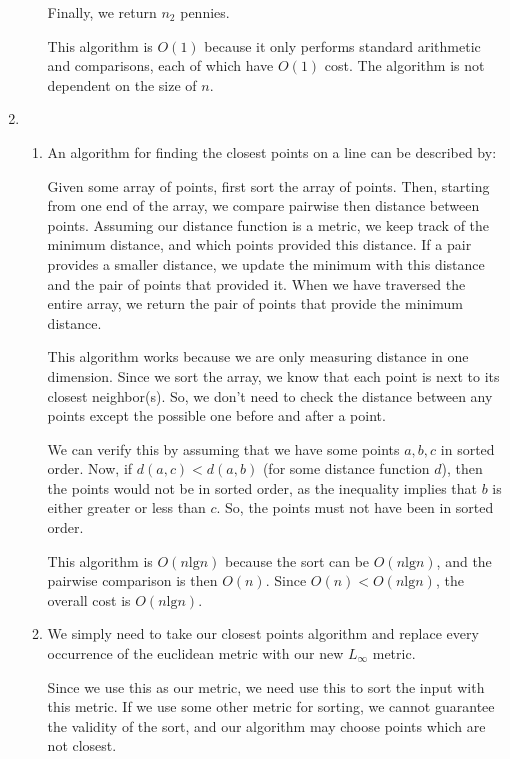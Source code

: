 \documentclass[12pt,letterpaper]{article}
\newcommand{\lb}[0]{\text{lg}}
\begin{document}
\begin{enumerate}
\begin{enumerate}
          Finally, we return $n_2$ pennies.

          This algorithm is $O(1)$ because it only performs standard arithmetic and comparisons, each of which have $O(1)$ cost.
          The algorithm is not dependent on the size of $n$.
      \end{enumerate}

    \item
      \begin{enumerate}
        \item An algorithm for finding the closest points on a line can be described by:

          Given some array of points, first sort the array of points.
          Then, starting from one end of the array, we compare pairwise then distance between points.
          Assuming our distance function is a metric, we keep track of the minimum distance, and which points provided this distance.
          If a pair provides a smaller distance, we update the minimum with this distance and the pair of points that provided it.
          When we have traversed the entire array, we return the pair of points that provide the minimum distance.

          This algorithm works because we are only measuring distance in one dimension.
          Since we sort the array, we know that each point is next to its closest neighbor(s).
          So, we don't need to check the distance between any points except the possible one before and after a point.

          We can verify this by assuming that we have some points $a, b, c$ in sorted order.
          Now, if $d(a, c) < d(a, b)$ (for some distance function $d$), then the points would not be in sorted order, as the inequality implies that $b$ is either greater or less than $c$. So, the points must not have been in sorted order.

          This algorithm is $O(n\lb{n})$ because the sort can be $O(n\lb{n})$, and the pairwise comparison is then $O(n)$.
          Since $O(n) < O(n\lb{n})$, the overall cost is $O(n\lb{n})$.

        \item
          We simply need to take our closest points algorithm and replace every occurrence of the euclidean metric with our new $L_{\infty}$ metric.

          Since we use this as our metric, we need use this to sort the input with this metric.
          If we use some other metric for sorting, we cannot guarantee the validity of the sort, and our algorithm may choose points which are not closest.


\end{enumerate}
\end{enumerate}
\end{document}
